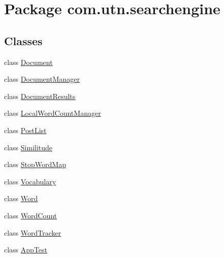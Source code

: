 \hypertarget{namespacecom_1_1utn_1_1searchengine}{\section{\-Package com.\-utn.\-searchengine}
\label{namespacecom_1_1utn_1_1searchengine}
}
\subsection*{\-Classes}
\begin{DoxyCompactItemize}
\item 
class \hyperlink{classcom_1_1utn_1_1searchengine_1_1_document}{\-Document}
\item 
class \hyperlink{classcom_1_1utn_1_1searchengine_1_1_document_manager}{\-Document\-Manager}
\item 
class \hyperlink{classcom_1_1utn_1_1searchengine_1_1_document_results}{\-Document\-Results}
\item 
class \hyperlink{classcom_1_1utn_1_1searchengine_1_1_local_word_count_manager}{\-Local\-Word\-Count\-Manager}
\item 
class \hyperlink{classcom_1_1utn_1_1searchengine_1_1_post_list}{\-Post\-List}
\item 
class \hyperlink{classcom_1_1utn_1_1searchengine_1_1_similitude}{\-Similitude}
\item 
class \hyperlink{classcom_1_1utn_1_1searchengine_1_1_stop_word_map}{\-Stop\-Word\-Map}
\item 
class \hyperlink{classcom_1_1utn_1_1searchengine_1_1_vocabulary}{\-Vocabulary}
\item 
class \hyperlink{classcom_1_1utn_1_1searchengine_1_1_word}{\-Word}
\item 
class \hyperlink{classcom_1_1utn_1_1searchengine_1_1_word_count}{\-Word\-Count}
\item 
class \hyperlink{classcom_1_1utn_1_1searchengine_1_1_word_tracker}{\-Word\-Tracker}
\item 
class \hyperlink{classcom_1_1utn_1_1searchengine_1_1_app_test}{\-App\-Test}
\end{DoxyCompactItemize}
